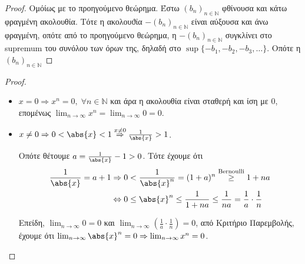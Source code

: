 \documentclass[main.tex]{subfiles}
\begin{document}

\begin{proof}
    Ομόίως με το προηγούμενο θεώρημα. Έστω 
    $ (b_{n})_{n \in \mathbb{N}} $ 
    φθίνουσα και κάτω φραγμένη ακολουθία. Τότε η ακολουϑία 
    $ -(b_{n})_{n \in \mathbb{N}} $ είναι αύξουσα και άνω φραγμένη, 
    οπότε από το προηγούμενο θεώρημα, η $ -(b_{n})_{n \in \mathbb{N}} $
    συγκλίνει στο supremum του συνόλου των όρων της, δηλαδή στο  
    $ \sup \{ - b_{1}, - b_{2}, -b_{3}, \ldots \}$. Οπότε η 
    $ (b_{n})_{n \in \mathbb{N}} $ 
\end{proof}


\begin{proof}
\item {}
    \begin{itemize}
        \item $ x = 0 \Rightarrow x^{n} = 0, \; \forall n \in 
            \mathbb{N} $ και άρα η ακολουθία είναι σταθερή και ίση με 
            0, επομένως 
            $ \lim_{n \to \infty} x^{n} = \lim_{n \to \infty} 0 = 0 $.

        \item $ x \neq 0 \Rightarrow 0 < \abs{x} < 1 
            \overset{x \neq 0}{\Rightarrow} \frac{1}{\abs{x}} > 1  $. 

            Οπότε θέτουμε $ a = \frac{1}{\abs{x}} - 1 > 0 $. Τότε έχουμε ότι 
            \begin{align*} 
                \frac{1}{\abs{x}} = a+1 
                    &\Rightarrow 0< \frac{1}{\abs{x}^{n}}  = (1+a)^{n}
                    \overset{\text{Bernoulli}}{\geq} 1 + na \\ 
                    & \Leftrightarrow 0 \leq \abs{x}^{n} \leq 
                    \frac{1}{1+na} \leq \frac{1}{na} = \frac{1}{a} 
                    \cdot \frac{1}{n} 
            \end{align*} 

            Επείδη, $ \lim_{n \to \infty} 0 = 0 $ και 
            $ \lim_{n \to \infty} \left(\frac{1}{a} \cdot \frac{1}{n} 
            \right) = 0$, από Κριτήριο Παρεμβολής, έχουμε ότι 
            $ \lim_{n \to \infty} \abs{x} ^{n} = 
            0 \Rightarrow \lim_{n \to \infty}x^{n} = 0$.
    \end{itemize}
\end{proof}
\end{document}
